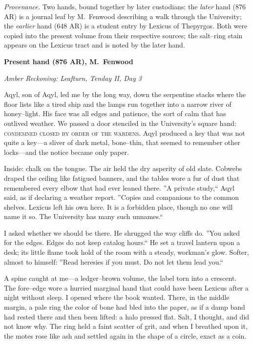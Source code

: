 \documentclass[11pt]{article}
\numberwithin{equation}{section} %
\theoremstyle{plain} %
\theoremstyle{definition} %
\theoremstyle{remark} %
\begin{document}
\noindent\textit{Provenance.} Two hands, bound together by later custodians: the \emph{later} hand (876 AR) is a journal leaf by M.\ Fenwood describing a walk through the University; the \emph{earlier} hand (648 AR) is a student entry by Lexicus of Thepyrgos. Both were copied into the present volume from their respective sources; the salt--ring stain appears on the Lexicus tract and is noted by the later hand.

\medskip
\noindent\textbf{Present hand (876 AR), M.\ Fenwood}

\noindent\textit{Amber Reckoning: Leafturn, Tenday II, Day 3}

Aqyl, son of Aqyl, led me by the long way, down the serpentine stacks where the floor lists like a tired ship and the lamps run together into a narrow river of honey--light. His face was all edges and patience, the sort of calm that has outlived weather. We passed a door stenciled in the University's square hand: \textsc{condemned \textemdash{} closed by order of the wardens}. Aqyl produced a key that was not quite a key---a sliver of dark metal, bone--thin, that seemed to remember other locks---and the notice became only paper.

Inside: chalk on the tongue. The air held the dry asperity of old slate. Cobwebs draped the ceiling like fatigued banners, and the tables wore a fur of dust that remembered every elbow that had ever leaned there. ''A private study,`` Aqyl said, as if declaring a weather report. ''Copies and companions to the common shelves. Lexicus left his own here. It is a forbidden place, though no one will name it so. The University has many such unnames.``

I asked whether we should be there. He shrugged the way cliffs do. ''You asked for the edges. Edges do not keep catalog hours.`` He set a travel lantern upon a desk; its little flame took hold of the room with a steady, workman's glow. Softer, almost to himself: ''Read heresies if you must. Do not let them lead you.``

A spine caught at me---a ledger--brown volume, the label torn into a crescent. The fore--edge wore a hurried marginal hand that could have been Lexicus after a night without sleep. I opened where the book wanted. There, in the middle margin, a pale ring the color of bone had bled into the paper, as if a damp band had rested there and then been lifted: a halo pressed flat. Salt, I thought, and did not know why. The ring held a faint scatter of grit, and when I breathed upon it, the motes rose like ash and settled again in the shape of a circle, exact as a coin.
\end{document}
